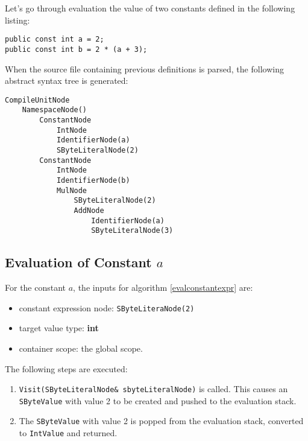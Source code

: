 \documentclass[a4paper,oneside,11pt]{book}
\theoremstyle{definition}
\begin{document}
Let's go through evaluation the value of two constants defined in the following listing:

\lstset{language=Cmajor}
\begin{lstlisting}
public const int a = 2;
public const int b = 2 * (a + 3);
\end{lstlisting}

\begin{flushleft}
When the source file containing previous definitions is parsed, the following abstract syntax tree is generated:

\begin{verbatim}
CompileUnitNode
    NamespaceNode()
        ConstantNode
            IntNode
            IdentifierNode(a)
            SByteLiteralNode(2)
        ConstantNode
            IntNode
            IdentifierNode(b)
            MulNode
                SByteLiteralNode(2)
                AddNode
                    IdentifierNode(a)
                    SByteLiteralNode(3)
\end{verbatim}
\end{flushleft}

\subsection{Evaluation of Constant $a$}

For the constant $a$, the inputs for algorithm \ref{evalconstantexpr} are:
\begin{itemize}
\item
constant expression node: \verb|SByteLiteraNode(2)|
\item
target value type: \textbf{int}
\item
container scope: the global scope.
\end{itemize}
The following steps are executed:
\begin{enumerate}
\item
\verb|Visit(SByteLiteralNode& sbyteLiteralNode)| is called.
This causes an \verb|SByteValue| with value 2 to be created and pushed to the evaluation stack.
\item
The \verb|SByteValue| with value 2 is popped from the evaluation stack, converted to \verb|IntValue| and returned.
\end{enumerate}
\end{document}
